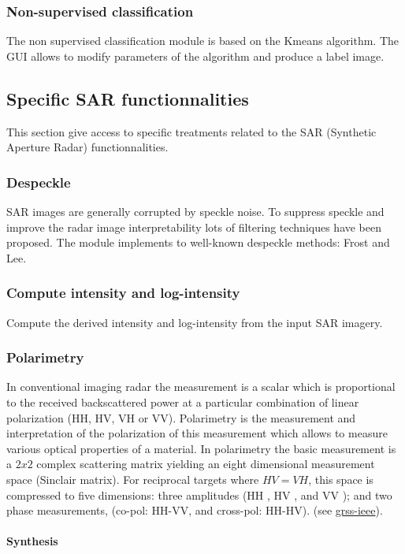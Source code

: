 \subsubsection{Non-supervised classification}
The non supervised classification module is based on the Kmeans
algorithm.  The GUI allows to modify parameters of the algorithm and
produce a label image.

\subsection{Specific SAR functionnalities}
This section give access to specific treatments related to the SAR
(Synthetic Aperture Radar) functionnalities.

\subsubsection{Despeckle}
SAR images are generally corrupted by speckle noise. To suppress 
speckle and improve the radar image interpretability lots of filtering 
techniques have been proposed.  The module implements to well-known 
despeckle methods: Frost and Lee.

\subsubsection{Compute intensity and log-intensity}
Compute the derived intensity and log-intensity from the input SAR imagery.

\subsubsection{Polarimetry}
In conventional imaging radar the measurement is a scalar which is 
proportional to the received backscattered power at a particular combination 
of linear polarization (HH, HV, VH or VV). 
Polarimetry is the measurement and interpretation of the polarization of this measurement which
allows to measure various optical properties of a material.
In polarimetry the basic measurement is a $2x2$ complex scattering
matrix yielding an eight dimensional measurement space (Sinclair
matrix). For reciprocal targets where $HV=VH$, this space is
compressed to five dimensions: three amplitudes (\mid HH \mid, \mid HV \mid, and
\mid VV \mid); and two phase measurements, (co-pol: HH-VV, and cross-pol:
HH-HV). (see
\href{http://www.grss-ieee.org/technical-briefs/imaging-radar-polarimetry}{grss-ieee}).
 
\paragraph{Synthesis} \\

